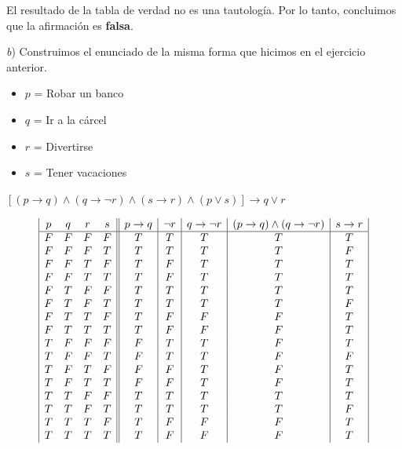 \documentclass[11pt,a4paper]{article}
\begin{document}
\begin{enumerate}
\vspace{0.5cm}

El resultado de la tabla de verdad no es una tautología. Por lo tanto, concluimos que la afirmación es \textbf{falsa}.

\vspace{0.5cm}

\textit{b}) Construimos el enunciado de la misma forma que hicimos en el ejercicio anterior.

\begin{itemize}
\item $p$ = Robar un banco
\item $q$ = Ir a la cárcel
\item $r$ = Divertirse
\item  $s$ = Tener vacaciones
\end{itemize}

\begin{center}

$[(p \rightarrow q) \wedge (q \rightarrow \neg r) \wedge (s \rightarrow r) \wedge (p \vee s)] \rightarrow q \vee r$

\end{center}

\begin{displaymath}
\begin{array}{|c c c c||c|c|c|c|c|}
p & q & r & s & p \rightarrow q & \neg r & q \rightarrow \neg r & (p \rightarrow q) \wedge (q \rightarrow \neg r) & s \rightarrow r \\ %
\hline 
F & F & F & F & T & T & T & T & T\\
F & F & F & T & T & T & T & T & F\\
F & F & T & F & T & F & T & T & T\\
F & F & T & T & T & F & T & T & T\\
F & T & F & F & T & T & T & T & T\\
F & T & F & T & T & T & T & T & F\\
F & T & T & F & T & F & F & F & T\\
F & T & T & T & T & F & F & F & T\\
T & F & F & F & F & T & T & F & T\\
T & F & F & T & F & T & T & F & F\\
T & F & T & F & F & F & T & F & T\\
T & F & T & T & F & F & T & F & T\\
T & T & F & F & T & T & T & T & T\\
T & T & F & T & T & T & T & T & F\\
T & T & T & F & T & F & F & F & T\\
T & T & T & T & T & F & F & F & T\\
\end{array}
\end{displaymath}



\end{enumerate}
\end{document}
